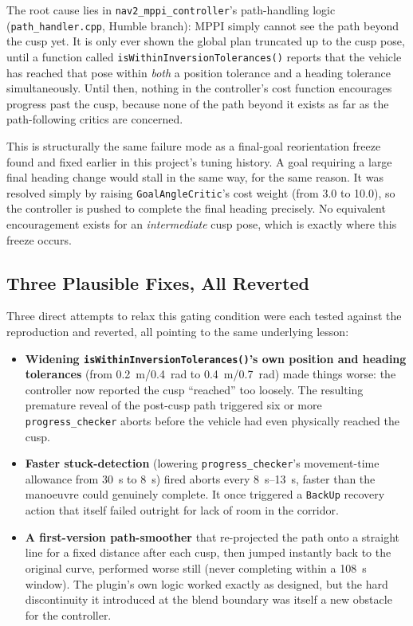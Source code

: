 The root cause lies in \texttt{nav2\_mppi\_controller}'s path-handling
logic (\texttt{path\_handler.cpp}, Humble branch): MPPI simply cannot
see the path beyond the cusp yet. It is only ever shown the global
plan truncated up to the cusp pose, until a function called
\texttt{isWithinInversionTolerances()} reports that the vehicle has
reached that pose within \emph{both} a position tolerance and a
heading tolerance simultaneously. Until then, nothing in the
controller's cost function encourages progress past the cusp, because
none of the path beyond it exists as far as the path-following critics
are concerned.

This is structurally the same failure mode as a final-goal
reorientation freeze found and fixed earlier in this project's tuning
history. A goal requiring a large final heading change would stall in the same way,
for the same reason. It was resolved simply by raising
\texttt{GoalAngleCritic}'s cost weight (from 3.0 to 10.0), so the
controller is pushed to complete the final heading precisely. No
equivalent encouragement exists for an \emph{intermediate} cusp pose,
which is exactly where this freeze occurs.

\subsection{Three Plausible Fixes, All Reverted}
\label{sec:cusp-fixes-failed}

Three direct attempts to relax this gating condition were each tested
against the reproduction and reverted, all pointing to the same
underlying lesson:

\begin{itemize}
  \item \textbf{Widening \texttt{isWithinInversionTolerances()}'s own
    position and heading tolerances} (from \SI{0.2}{\meter}/\SI{0.4}{\radian}
    to \SI{0.4}{\meter}/\SI{0.7}{\radian}) made things worse: the
    controller now reported the cusp ``reached'' too loosely. The
    resulting premature reveal of the post-cusp path triggered
    six or more \texttt{progress\_checker} aborts before the vehicle
    had even physically reached the cusp.
  \item \textbf{Faster stuck-detection} (lowering
    \texttt{progress\_checker}'s movement-time allowance from
    \SI{30}{\second} to \SI{8}{\second}) fired aborts every
    \SIrange{8}{13}{\second}, faster than the manoeuvre could
    genuinely complete. It once triggered a \texttt{BackUp}
    recovery action that itself failed outright for lack of room in
    the corridor.
  \item \textbf{A first-version path-smoother} that re-projected the
    path onto a straight line for a fixed distance after each cusp,
    then jumped instantly back to the original curve, performed worse
    still (never completing within a \SI{108}{\second} window). The
    plugin's own logic worked exactly as designed, but the hard
    discontinuity it introduced at the blend boundary was itself a new
    obstacle for the controller.
\end{itemize}

